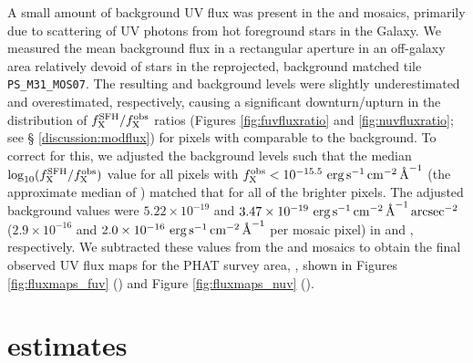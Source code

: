 \documentclass[iop, tighten]{emulateapj}
\begin{document}
A small amount of background UV flux was present in the \fuv{} and \nuv{}
mosaics, primarily due to scattering of UV photons from hot foreground stars in
the Galaxy. We measured the mean background flux in a rectangular aperture in
an off-galaxy area relatively devoid of stars in the reprojected, background
matched tile \texttt{PS\_M31\_MOS07}. The resulting \fuv{} and \nuv{}
background levels were slightly underestimated and overestimated, respectively,
causing a significant downturn/upturn in the distribution of $f_{\mathrm{X}}^{\mathrm{SFH}}/f_{\mathrm{X}}^{\mathrm{obs}}$
ratios (Figures \ref{fig:fuvfluxratio} and \ref{fig:nuvfluxratio}; see \S
\ref{discussion:modflux}) for pixels with \fxobs{} comparable to the
background. To correct for this, we adjusted the background levels such that
the median $\log_{10}(f_{\mathrm{X}}^{\mathrm{SFH}}/f_{\mathrm{X}}^{\mathrm{obs}})$ value for all pixels with $f_{\mathrm{X}}^{\mathrm{obs}} <
10^{-15.5}\, \,\mathrm{erg}\,\mathrm{s}^{-1}\,\mathrm{cm}^{-2}\,\textrm{\AA}^{-1}$ (the approximate median of \fxobs{}) matched that for all
of the brighter pixels. The adjusted background values were $5.22 \times
10^{-19}$ and $3.47 \times 10^{-19}\, \,\mathrm{erg}\,\mathrm{s}^{-1}\,\mathrm{cm}^{-2}\,\textrm{\AA}^{-1}\,\mathrm{arcsec}^{-2}$ ($2.9 \times
10^{-16}$ and $2.0 \times 10^{-16}\, \,\mathrm{erg}\,\mathrm{s}^{-1}\,\mathrm{cm}^{-2}\,\textrm{\AA}^{-1}$ per mosaic pixel) in \fuv{} and
\nuv{}, respectively. We subtracted these values from the \fuv{} and \nuv{}
mosaics to obtain the final observed UV flux maps for the PHAT survey area,
\fxobs{}, shown in Figures \ref{fig:fluxmaps_fuv} (\fuv{}) and Figure
\ref{fig:fluxmaps_nuv} (\nuv{}).

%
%





\section{\sfr{} estimates}\label{sfrestimates}
\end{document}
